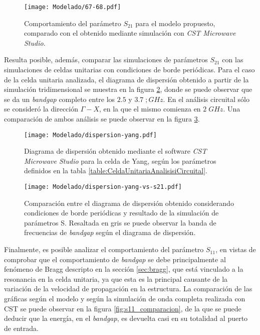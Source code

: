 \begin{figure}[h]
	\centering
	\texttt{[image: Modelado/67-68.pdf]}
	\caption{Comportamiento del parámetro $S_{21}$ para el modelo propuesto, comparado con el obtenido mediante simulación con \textit{CST Microwave Studio}.}
	\label{fig:s12_modelo_final}
\end{figure}

Resulta posible, además, comparar las simulaciones de parámetros $S_{21}$ con las simulaciones de celdas unitarias con condiciones de borde periódicas. Para el caso de la celda unitaria analizada, el diagrama de dispersión obtenido a partir de la simulación tridimensional se muestra en la figura \ref{fig:diag-disp-yang-cst}, donde se puede observar que se da un \textit{bandgap} completo entre los $2.5$ y $3.7\;;GHz$. En el análisis circuital sólo se consideró la dirección $\Gamma-X$, en la que el mismo comienza en $2\; GHz$. Una comparación de ambos análisis se puede observar en la figura \ref{fig:diag-disp-yang-vs-s21}.

\begin{figure}[h]
	\centering
	\texttt{[image: Modelado/dispersion-yang.pdf]}
	\caption{Diagrama de dispersión obtenido mediante el software \textit{CST Microwave Studio} para la celda de Yang, según los parámetros definidos en la tabla \ref{table:CeldaUnitariaAnalisisiCircuital}.}
	\label{fig:diag-disp-yang-cst}
\end{figure}

\begin{figure}[h]
	\centering
	\texttt{[image: Modelado/dispersion-yang-vs-s21.pdf]}
	\caption{Comparación entre el diagrama de dispersión obtenido considerando condiciones de borde periódicas y resultado de la simulación de parámetros S. Resaltada en gris se puede observar la banda de frecuencias de \textit{bandgap} según el diagrama de dispersión.}
	\label{fig:diag-disp-yang-vs-s21}
\end{figure}

Finalmente, es posible analizar el comportamiento del parámetro $S_{11}$, en vistas de comprobar que el comportamiento de \textit{bandgap} se debe principalmente al fenómeno de Bragg descripto en la sección \ref{sec:bragg}, que está vinculado a la resonancia en la celda unitaria, ya que esta es la principal causante de la variación de la velocidad de propagación en la estructura. La comparación de las gráficas según el modelo y según la simulación de onda completa realizada con CST se puede observar en la figura \ref{fig:s11_comparacion}, de la que se puede deducir que la energía, en el \textit{bandgap}, es devuelta casi en su totalidad al puerto de entrada.

